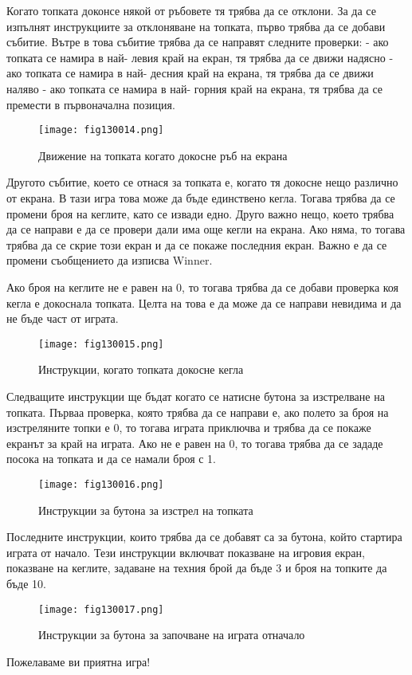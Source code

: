 Когато топката доконсе някой от ръбовете тя трябва да се отклони. За да се изпълнят инструкциите за отклоняване на топката, първо трябва да се добави събитие. Вътре в това събитие трябва да се направят следните проверки:
- ако топката се намира в най- левия край на екран, тя трябва да се движи надясно
- ако топката се намира в най- десния край на екрана, тя трябва да се движи наляво
- ако топката се намира в най- горния край на екрана, тя трябва да се премести в първоначална позиция.

\begin{figure}[H]
  \centering
  \texttt{[image: fig130014.png]}
  \caption{Движение на топката когато докосне ръб на екрана}
\label{fig130014}
\end{figure}

Другото събитие, което се отнася за топката е, когато тя докосне нещо различно от екрана. В тази игра това може да бъде единствено кегла. Тогава трябва да се промени броя на кеглите, като се извади едно. Друго важно нещо, което трябва да се направи е да се провери дали има още кегли на екрана. Ако няма, то тогава трябва да се скрие този екран и да се покаже последния екран. Важно е да се промени съобщението да изписва Winner.

Ако броя на кеглите не е равен на 0, то тогава трябва да се добави проверка коя кегла е докоснала топката. Целта на това е да може да се направи невидима и да не бъде част от играта.

\begin{figure}[H]
  \centering
  \texttt{[image: fig130015.png]}
  \caption{Инструкции, когато топката докосне кегла}
\label{fig130015}
\end{figure}

Следващите инструкции ще бъдат когато се натисне бутона за изстрелване на топката. Първаа проверка, която трябва да се направи е, ако полето за броя на изстреляните топки е 0, то тогава играта приключва и трябва да се покаже екранът за край на играта. Ако не е равен на 0, то тогава трябва да се зададе посока на топката и да се намали броя с 1.

\begin{figure}[H]
  \centering
  \texttt{[image: fig130016.png]}
  \caption{Инструкции за бутона за изстрел на топката}
\label{fig130016}
\end{figure}

Последните инструкции, които трябва да се добавят са за бутона, който стартира играта от начало. Тези инструкции включват показване на игровия екран, показване на кеглите, задаване на техния брой да бъде 3 и броя на топките да бъде 10.

\begin{figure}[H]
  \centering
  \texttt{[image: fig130017.png]}
  \caption{Инструкции за бутона за започване на играта отначало}
\label{fig130017}
\end{figure}

Пожелаваме ви приятна игра!
